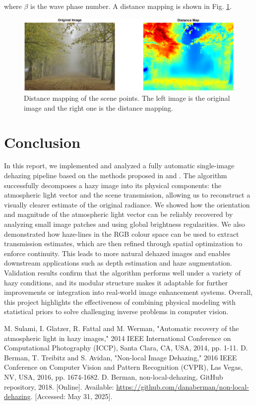 \documentclass[conference]{IEEEtran}
\begin{document}
where $\beta$ is the wave phase number. A distance mapping is shown in Fig. \ref{distance_mapping}.
\begin{figure}
    \centering
    \includegraphics[width=\linewidth]{img/distance_mapping.png}
    \caption{Distance mapping of the scene points. The left image is the original image and the right one is the distance mapping.}
    \label{distance_mapping}
\end{figure}

\section{Conclusion}

In this report, we implemented and analyzed a fully automatic single-image dehazing pipeline based on the methods proposed in \cite{airlight} and \cite{dehaze}. The algorithm successfully decomposes a hazy image into its physical components: the atmospheric light vector and the scene transmission, allowing us to reconstruct a visually clearer estimate of the original radiance.
We showed how the orientation and magnitude of the atmospheric light vector can be reliably recovered by analyzing small image patches and using global brightness regularities. We also demonstrated how haze-lines in the RGB colour space can be used to extract transmission estimates, which are then refined through spatial optimization to enforce continuity. This leads to more natural dehazed images and enables downstream applications such as depth estimation and haze augmentation.
Validation results confirm that the algorithm performs well under a variety of hazy conditions, and its modular structure makes it adaptable for further improvements or integration into real-world image enhancement systems. Overall, this project highlights the effectiveness of combining physical modeling with statistical priors to solve challenging inverse problems in computer vision.

\vspace{12pt}

\begin{thebibliography}{00}
 M. Sulami, I. Glatzer, R. Fattal and M. Werman, "Automatic recovery of the atmospheric light in hazy images," 2014 IEEE International Conference on Computational Photography (ICCP), Santa Clara, CA, USA, 2014, pp. 1-11.
 D. Berman, T. Treibitz and S. Avidan, "Non-local Image Dehazing," 2016 IEEE Conference on Computer Vision and Pattern Recognition (CVPR), Las Vegas, NV, USA, 2016, pp. 1674-1682.
D. Berman, non-local-dehazing, GitHub repository, 2018. [Online]. Available: \url{https://github.com/danaberman/non-local-dehazing}. [Accessed: May 31, 2025].
\end{thebibliography}
\end{document}
